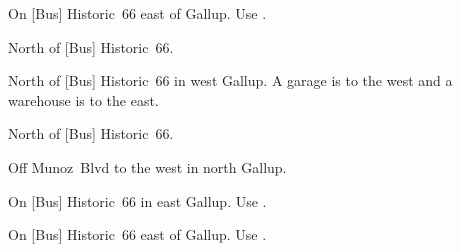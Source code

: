 
\begin{LocationList}

On [Bus] Historic~66 east of Gallup.
Use  .

North of [Bus] Historic~66.

North of [Bus] Historic~66 in west Gallup.
A garage is to the west and a warehouse is to the east.

North of [Bus] Historic~66.

Off  Munoz~Blvd to the west in north Gallup.

\Location{\TruckService \Service}
On [Bus] Historic~66 in east Gallup.
Use  .

\Location{\TruckStop \Gas \Rest \Weigh}
On [Bus] Historic~66 east of Gallup.
Use  .

\end{LocationList}
